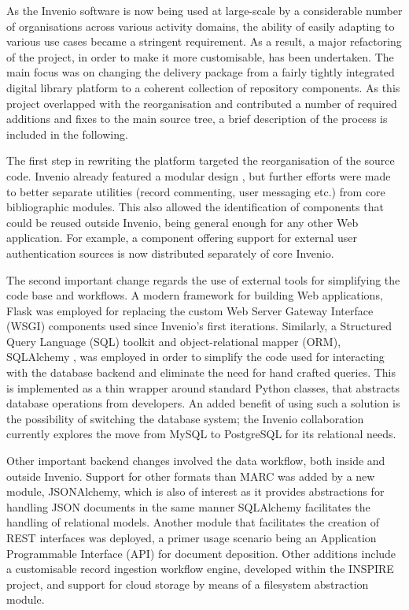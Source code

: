 
As the Invenio software is now being used at large-scale by a considerable
number of organisations across various activity domains, the ability of easily
adapting to various use cases became a stringent requirement. As a result, a
major refactoring of the project, in order to make it more customisable, has
been undertaken. The main focus was on changing the delivery package from a
fairly tightly integrated digital library platform to a coherent collection of
repository components. As this project overlapped with the reorganisation and
contributed a number of required additions and fixes to the main source tree, a
brief description of the process is included in the following.

The first step in rewriting the platform targeted the reorganisation of the
source code. Invenio already featured a modular design \cite{ref:lemeur}, but
further efforts were made to better separate utilities (record commenting, user
messaging etc.) from core bibliographic modules. This also allowed the
identification of components that could be reused outside Invenio, being
general enough for any other Web application. For example, a component offering
support for external user authentication sources is now distributed separately
of core Invenio.

The second important change regards the use of external tools for simplifying
the code base and workflows. A modern framework for building Web applications,
Flask \cite{ref:flask} was employed for replacing the custom Web Server Gateway
Interface (WSGI) components used since Invenio's first iterations. Similarly, a
Structured Query Language (SQL) toolkit and object-relational mapper (ORM),
SQLAlchemy \cite{ref:sqlalchemy}, was employed in order to simplify the code
used for interacting with the database backend and eliminate the need for hand
crafted queries. This is implemented as a thin wrapper around standard Python
classes, that abstracts database operations from developers. An added benefit
of using such a solution is the possibility of switching the database system;
the Invenio collaboration currently explores the move from MySQL to PostgreSQL
for its relational needs.

Other important backend changes involved the data workflow, both inside and
outside Invenio. Support for other formats than MARC was added by a new module,
JSONAlchemy, which is also of interest as it provides abstractions for handling
JSON documents in the same manner SQLAlchemy facilitates the handling of
relational models. Another module that facilitates the creation of REST
interfaces was deployed, a primer usage scenario being an Application
Programmable Interface (API) for document deposition.  Other additions include a
customisable record ingestion workflow engine, developed within the INSPIRE
project, and support for cloud storage by means of a filesystem abstraction
module.

